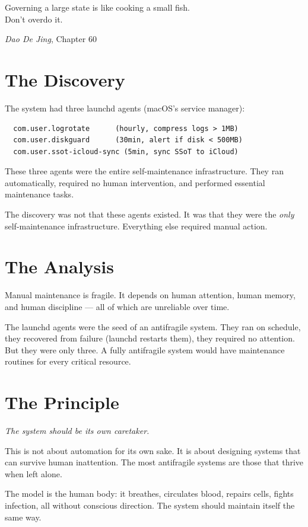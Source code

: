 \documentclass[12pt,a4paper,oneside]{book}
\begin{document}
\epigraph{Governing a large state is like cooking a small fish.\\Don't overdo it.}{\textit{Dao De Jing}, Chapter 60}

\section{The Discovery}

The system had three launchd agents (macOS's service manager):
\begin{verbatim}
  com.user.logrotate      (hourly, compress logs > 1MB)
  com.user.diskguard      (30min, alert if disk < 500MB)
  com.user.ssot-icloud-sync (5min, sync SSoT to iCloud)
\end{verbatim}

These three agents were the entire self-maintenance infrastructure. They ran automatically, required no human intervention, and performed essential maintenance tasks.

The discovery was not that these agents existed. It was that they were the \emph{only} self-maintenance infrastructure. Everything else required manual action.

\section{The Analysis}

Manual maintenance is fragile. It depends on human attention, human memory, and human discipline --- all of which are unreliable over time.

The launchd agents were the seed of an antifragile system. They ran on schedule, they recovered from failure (launchd restarts them), they required no attention. But they were only three. A fully antifragile system would have maintenance routines for every critical resource.

\section{The Principle}

\emph{The system should be its own caretaker.}

This is not about automation for its own sake. It is about designing systems that can survive human inattention. The most antifragile systems are those that thrive when left alone.

The model is the human body: it breathes, circulates blood, repairs cells, fights infection, all without conscious direction. The system should maintain itself the same way.
\end{document}
